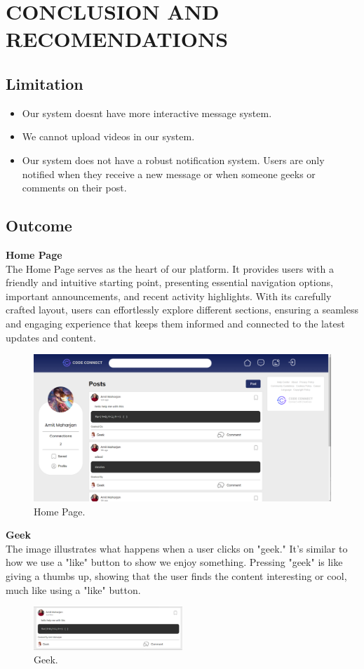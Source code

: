 \chapter{CONCLUSION AND RECOMENDATIONS}
\section{Limitation}
\begin{itemize}
    \item Our system doesnt have more interactive message system.
    \item We cannot upload videos in our system.
    \item Our system does not have a robust notification system. Users are only notified when they receive a new message or when someone geeks or comments on their post.
\end{itemize}
\section{Outcome}
\textbf{Home Page}
\\The Home Page serves as the heart of our platform. It provides users with a friendly and intuitive starting point, presenting essential navigation options, important announcements, and recent activity highlights. With its carefully crafted layout, users can effortlessly explore different sections, ensuring a seamless and engaging experience that keeps them informed and connected to the latest updates and content.
\begin{figure}[ht]
    \centering
    \includegraphics[width=1\textwidth]{Outcome-ss/homepage.png}
    \caption{Home Page.}
    \label{fig:Home Page}
\end{figure}

\textbf{Geek}
\\The image illustrates what happens when a user clicks on "geek." It's similar to how we use a "like" button to show we enjoy something. Pressing "geek" is like giving a thumbs up, showing that the user finds the content interesting or cool, much like using a "like" button.
\begin{figure}[ht]
    \centering
    \includegraphics[width=0.5\textwidth]{Outcome-ss/geek.png}
    \caption{Geek.}
    \label{fig:Geek}
\end{figure}


